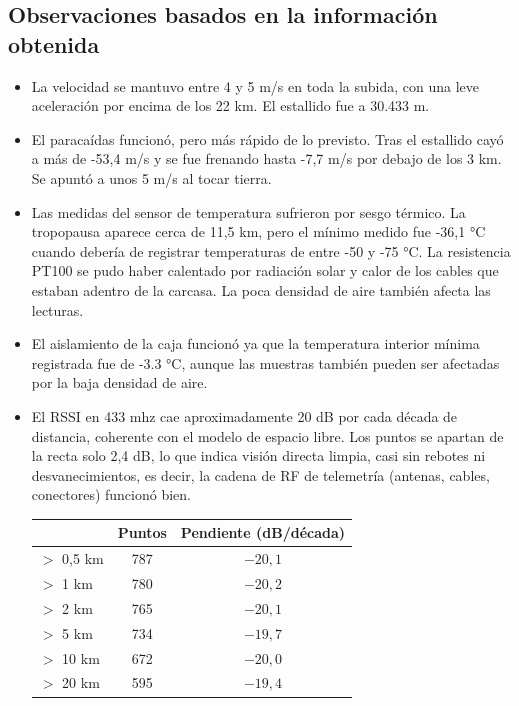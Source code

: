 \documentclass[12pt,a4paper]{article}
\begin{document}
\subsection{Observaciones basados en la información obtenida}\label{observaciones-basados-en-la-informaciuxf3n-obtenida}
\begin{itemize}
  \item La velocidad se mantuvo entre 4 y 5 m/s en toda la subida, con una leve aceleración por encima de los 22 km. El estallido fue a 30.433 m.
  \item El paracaídas funcionó, pero más rápido de lo previsto. Tras el estallido cayó a más de -53,4 m/s y se fue frenando hasta -7,7 m/s por debajo de los 3 km. Se apuntó a unos 5 m/s al tocar tierra.
  \item Las medidas del sensor de temperatura sufrieron por sesgo térmico. La tropopausa aparece cerca de 11,5 km, pero el mínimo medido fue -36,1 °C cuando debería de registrar temperaturas de entre -50 y -75 °C. La resistencia PT100 se pudo haber calentado por radiación solar y calor de los cables que estaban adentro de la carcasa. La poca densidad de aire también afecta las lecturas.
  \item El aislamiento de la caja funcionó ya que la temperatura interior mínima registrada fue de -3.3 °C, aunque las muestras también pueden ser afectadas por la baja densidad de aire.
  \item El RSSI en 433 mhz cae aproximadamente 20 dB por cada década de distancia, coherente con el modelo de espacio libre. Los puntos se apartan de la recta solo 2,4 dB, lo que indica visión directa limpia, casi sin rebotes ni desvanecimientos, es decir, la cadena de RF de telemetría (antenas, cables, conectores) funcionó bien. 
  \begin{center}
    \begin{tabular}{|l|c|c|}
      \hline
      \textbf{} & \textbf{Puntos} & \textbf{Pendiente (dB/década)} \\
      \hline
      $>$ 0,5 km & 787 & $-20{,}1$ \\
      $>$ 1 km   & 780 & $-20{,}2$ \\
      $>$ 2 km   & 765 & $-20{,}1$ \\
      $>$ 5 km   & 734 & $-19{,}7$ \\
      $>$ 10 km  & 672 & $-20{,}0$ \\
      $>$ 20 km  & 595 & $-19{,}4$ \\
      \hline
    \end{tabular}
  \end{center}
\end{itemize}
\end{document}
